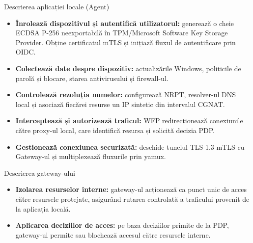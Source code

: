 \documentclass[aspectratio=169,12pt]{beamer}
\begin{document}
\begin{frame}{Descrierea aplicației locale (Agent)}
\vspace{0.12cm}
{%
\small
\begin{itemize}
  \setlength{\itemsep}{0.23cm}
  \item \textbf{Înrolează dispozitivul și autentifică utilizatorul:} generează o cheie ECDSA P-256 neexportabilă în TPM/Microsoft Software Key Storage Provider. Obține certificatul mTLS și inițiază fluxul de autentificare prin OIDC.
  \item \textbf{Colectează date despre dispozitiv:} actualizările Windows, politicile de parolă și blocare, starea antivirusului și firewall-ul.
  \item \textbf{Controlează rezoluția numelor:} configurează NRPT, resolver-ul DNS local și asociază fiecărei resurse un IP sintetic din intervalul CGNAT.
  \item \textbf{Interceptează și autorizează traficul:} WFP redirecționează conexiunile către proxy-ul local, care identifică resursa și solicită decizia PDP.
  \item \textbf{Gestionează conexiunea securizată:} deschide tunelul TLS 1.3 mTLS cu Gateway-ul și multiplexează fluxurile prin yamux.
\end{itemize}
}
\end{frame}

\begin{frame}{Descrierea gateway-ului}
\vspace{0.12cm}
{%
\small
\begin{itemize}
  \setlength{\itemsep}{0.23cm}
  \item \textbf{Izolarea resurselor interne:} gateway-ul acționează ca punct unic de acces către resursele protejate, asigurând rutarea controlată a traficului provenit de la aplicația locală.
  \item \textbf{Aplicarea deciziilor de acces:} pe baza deciziilor primite de la PDP, gateway-ul permite sau blochează accesul către resursele interne.
\end{itemize}
}
\end{frame}
\end{document}
